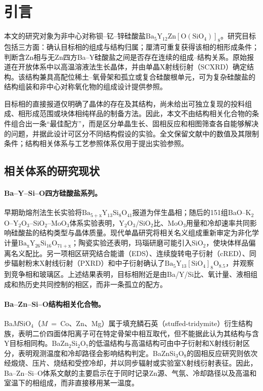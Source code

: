 \section{引言}
\label{sec:introduction}

本文的研究对象为非中心对称钡--钇--锌硅酸盐$\mathrm{Ba_5Y_{12}Zn[O(SiO_4)]_8}$。研究目标包括三方面：确认目标相的组成与结构归属；厘清可重复获得该相的相形成条件；判断含Zn相与无Zn四方Ba--Y硅酸盐之间是否存在连续的组成--结构关系。原始报道在开放体系中以高温溶液法生长晶体，并由单晶X射线衍射（SCXRD）确定结构\cite{ababaikeri2024ba5y12zn}。该结构兼具高配位稀土--氧骨架和孤立或复合硅酸根单元，可为复杂硅酸盐的结构组装和非中心对称氧化物的组成设计提供参照。

目标相的直接报道仅明确了晶体的存在及其结构，尚未给出可独立复现的投料组成、相形成范围或块体相纯样品的制备方法\cite{ababaikeri2024ba5y12zn}。因此，本文不由结构相关化合物的条件组合出一条“最佳配方”，而是区分单晶生长、固相反应和相图筛查各自能够解决的问题，并据此设计可区分不同结构假设的实验。全文保留文献中的数值及其限制条件；结构相关体系与工艺参照体系仅用于提出实验参照。

\subsection{相关体系的研究现状}

\paragraph{Ba--Y--Si--O四方硅酸盐系列。}
早期助熔剂法生长实验将$\mathrm{Ba_{5+x}Y_{13}Si_8O_{41}}$报道为伴生晶相；随后的151组BaO--K$_2$O--Y$_2$O$_3$--SiO$_2$--MoO$_3$体系实验表明，Y$_2$O$_3$\slash SiO$_2$比、MoO$_3$用量和冷却速率共同影响硅酸盐的结构类型与晶体质量\cite{kolitsch2009crystal,wierzbickawieczorek2017high}。现代单晶研究将相关名义组成重新审定为非化学计量$\mathrm{Ba_xY_{26}Si_{16}O_{71+x}}$；陶瓷实验还表明，玛瑙研磨可能引入SiO$_2$，使块体样品偏离名义配比\cite{yamane2024synthesis,yamane2024microstructure}。另一项相区研究结合能谱（EDS）、连续旋转电子衍射（cRED）、同步辐射粉末X射线衍射（PXRD）和中子衍射确认了$\mathrm{Ba_5Y_{13}[SiO_4]_8O_{8.5}}$，并观察到竞争相和玻璃区\cite{gulay2024navigation}。上述结果表明，目标相附近是由Ba\slash Y\slash Si比、氧计量、液相组成和热历史共同控制的相区，而非一条孤立的配方。

\paragraph{Ba--Zn--Si--O结构相关化合物。}
Ba$M$SiO$_4$（$M$~=~Co、Zn、Mg）属于填充鳞石英（stuffed-tridymite）衍生结构族，表明二价四面体阳离子可在特定骨架中相互取代，但不能据此认为其结构与含Y目标相同构\cite{liu1993structures}。BaZn$_2$Si$_2$O$_7$的低温结构与高温结构可由中子衍射和X射线衍射区分，表明观测温度和冷却路径会影响结构判定\cite{lin1999phase}。BaZnSi$_3$O$_8$的固相反应研究则依次经煅烧、压片、烧结和受控冷却，并以同步辐射或实验室X射线衍射表征\cite{zou2021crystal}。因此，Ba--Zn--Si--O体系文献的主要启示在于同时记录Zn源、气氛、冷却路径以及高温和室温下的相组成，而非直接移用某一温度。

